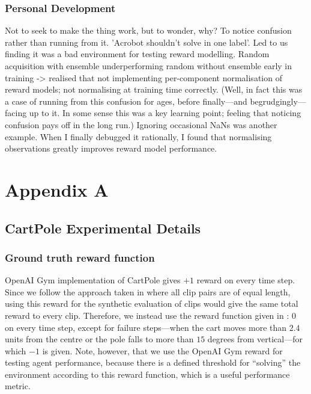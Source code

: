 \documentclass[11pt, a4paper, bibliography=totoc]{report}
\begin{document}
\subsection{Personal Development}
Not to seek to make the thing work, but to wonder, why? To notice confusion rather than running from it. 'Acrobot shouldn't solve in one label'. Led to us finding it was a bad environment for testing reward modelling.
Random acquisition with ensemble underperforming random without ensemble early in training -> realised that not implementing per-component normalisation of reward models; not normalising at training time correctly. (Well, in fact this was a case of running from this confusion for ages, before finally---and begrudgingly---facing up to it. In some sense this was a key learning point; feeling that noticing confusion pays off in the long run.)
Ignoring occasional NaNs was another example. When I finally debugged it rationally, I found that normalising observations greatly improves reward model performance.









\appendix
\appendixpage
\noappendicestocpagenum
\addappheadtotoc
\chapter{Appendix A} \label{appendix:a}
\section{CartPole Experimental Details}
\subsection{Ground truth reward function}
OpenAI Gym implementation of CartPole gives $ +1 $ reward on every time step. Since we follow the approach taken in \cite{Christiano2017} where all clip pairs are of equal length, using this reward for the synthetic evaluation of clips would give the same total reward to every clip. Therefore, we instead use the reward function given in  \cite[p.~59]{Sutton2018}: $ 0 $ on every time step, except for failure steps---when the cart moves more than $ 2.4 $ units from the centre or the pole falls to more than $ 15 $ degrees from vertical---for which $ -1 $ is given. Note, however, that we use the OpenAI Gym reward for testing agent performance, because there is a defined threshold for ``solving'' the environment according to this reward function, which is a useful performance metric.
\end{document}
